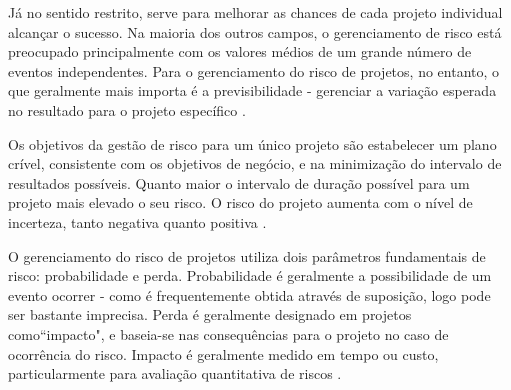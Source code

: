 Já no sentido restrito, serve para melhorar as chances de cada projeto individual alcançar o sucesso. Na maioria dos outros campos, o gerenciamento de risco está preocupado principalmente com os valores médios de um grande número de eventos independentes. Para o gerenciamento do risco de projetos, no entanto, o que geralmente mais importa é a previsibilidade - gerenciar a variação esperada	no resultado para o projeto específico \cite{kendrick2003identifying}.

Os objetivos da gestão de risco para um único projeto são estabelecer um plano crível, consistente com os objetivos de negócio, e na minimização do intervalo de resultados possíveis. Quanto maior o intervalo de duração possível para um projeto mais elevado o seu risco. O risco do projeto aumenta com o nível de incerteza, tanto negativa quanto positiva \cite{kendrick2003identifying}.

O gerenciamento do risco de projetos utiliza dois parâmetros fundamentais de risco: probabilidade e perda. Probabilidade é geralmente a possibilidade de um evento ocorrer - como é frequentemente obtida através de suposição, logo pode ser bastante imprecisa. Perda é geralmente designado em projetos como``impacto", e baseia-se nas consequências para o projeto no caso de ocorrência do risco. Impacto é geralmente medido em tempo ou custo, particularmente para avaliação quantitativa de riscos \cite{kendrick2003identifying}.

